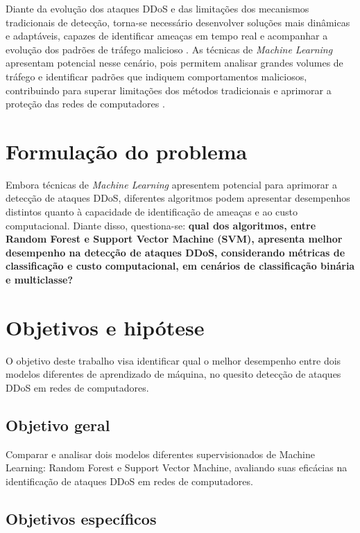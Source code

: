 \documentclass[
    12pt,                %
    openright,           %
    oneside,             %
    a4paper,             %
    english,             %
    brazil               %
]{abntex2}
\begin{document}
Diante da evolução dos ataques DDoS e das limitações dos mecanismos tradicionais de detecção, torna-se necessário desenvolver soluções mais dinâmicas e adaptáveis, capazes de identificar ameaças em tempo real e acompanhar a evolução dos padrões de tráfego malicioso \cite{thaqi2026}. As técnicas de \textit{Machine Learning} apresentam potencial nesse cenário, pois permitem analisar grandes volumes de tráfego e identificar padrões que indiquem comportamentos maliciosos, contribuindo para superar limitações dos métodos tradicionais e aprimorar a proteção das redes de computadores \cite{ouhssini2024}.
\section{Formulação do problema}
\label{sec:problema}

Embora técnicas de \textit{Machine Learning} apresentem potencial para aprimorar a detecção de ataques DDoS, diferentes algoritmos podem apresentar desempenhos distintos quanto à capacidade de identificação de ameaças e ao custo computacional. Diante disso, questiona-se: \textbf{qual dos algoritmos, entre Random Forest e Support Vector Machine (SVM), apresenta melhor desempenho na detecção de ataques DDoS, considerando métricas de classificação e custo computacional, em cenários de classificação binária e multiclasse?}

\section{Objetivos e hipótese}
\label{sec:objetivos}

O objetivo deste trabalho visa identificar qual o melhor desempenho entre dois modelos diferentes de aprendizado de máquina, no quesito detecção de ataques DDoS em redes de computadores.

\subsection{Objetivo geral}

Comparar e analisar dois modelos diferentes supervisionados de Machine Learning: Random Forest e Support Vector Machine, avaliando suas eficácias na identificação de ataques DDoS em redes de computadores.

\subsection{Objetivos específicos}
\end{document}
